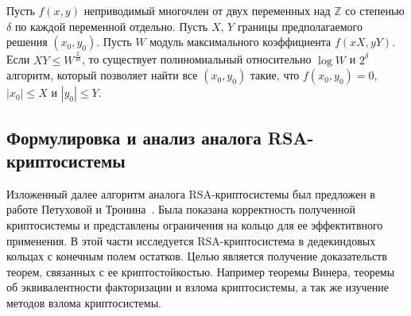 \documentclass[_00_dissertation.tex]{subfiles}
\begin{document}


\begin{statement}\label{statement:coppersmith}
  Пусть $f(x,y)$ неприводимый многочлен от двух переменных над $\mathbb{Z}$ со степенью $\delta$ по каждой переменной отдельно.
  Пусть $X$, $Y$ границы предполагаемого решения $(x_0, y_0)$.
  Пусть $W$ модуль максимального коэффициента $f(xX, yY)$.
  Если $XY\le W^{\frac{2}{3\delta}}$, то существует полиномиальный относительно $\log W$ и $2^\delta$ алгоритм, который позволяет найти все $(x_0,y_0)$ такие, что $f(x_0,y_0)=0$, $|x_0|\le X$ и $|y_0|\le Y$.
\end{statement}

\subsection{Формулировка и анализ аналога RSA-криптосистемы}

Изложенный далее алгоритм аналога RSA-криптосистемы был предложен в работе Петуховой и Тронина~\cite{source:Petukhova}.
Была показана корректность полученной криптосистемы и представлены ограничения  на кольцо для ее эффектитвного применения.
В этой части исследуется RSA-криптосистема в дедекиндовых кольцах с конечным полем остатков.
Целью является получение доказательств теорем, связанных с ее криптостойкостью.
Например теоремы Винера, теоремы об эквивалентности факторизации и взлома криптосистемы, а так же изучение методов взлома криптосистемы.
\end{document}
